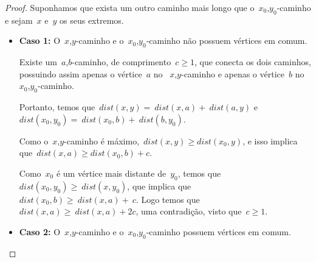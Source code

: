 \documentclass[a4paper,12pt]{article}
\begin{document}
	\begin{proof}
		Suponhamos que exista um outro caminho mais longo que 
		o~$x_0$,$y_0$-caminho e sejam~$x$ e~$y$ os seus extremos.

		\begin{itemize}
	        \item \textbf{Caso 1:} O~$x$,$y$-caminho e 
	        o~$x_0$,$y_0$-caminho não possuem vértices em comum.

	        Existe um~$a$,$b$-caminho, de 
	        comprimento~$c \ge 1$, que conecta os dois caminhos, 
	        possuindo assim apenas o vértice~$a$ 
	        no ~$x$,$y$-caminho e apenas o vértice~$b$ 
	        no~$x_0$,$y_0$-caminho.

	        \begin{center}  \end{center}


	        Portanto, temos 
	        que~$ dist(x,y) =~dist(x,a) +~dist(a,y)$ 
	        e~$ dist(x_0,y_0) =~dist(x_0,b) +~dist(b,y_0)$.

	        Como o~$x$,$y$-caminho é 
	        máximo,~$dist(x,y)\ge dist(x_0,y)$,
	        e isso implica que~$dist(x,a)\ge dist(x_0,b)+c$.

	        Como~$x_0$ é um vértice mais distante de~$y_0$, temos 
	        que~$dist(x_0,y_0)\ge~dist(x,y_0)$, que implica 
	        que~$dist(x_0,b)\ge~dist(x,a)+~c$.
	        Logo temos 
	        que~$dist(x,a)\ge~dist(x, a)+2c$,
	        uma contradição, visto que~$c\ge 1$.


			\bigskip
			\bigskip
			\bigskip


			\item \textbf{Caso 2:} O~$x$,$y$-caminho e 
			o~$x_0$,$y_0$-caminho possuem vértices em comum.


\end{itemize}
\end{proof}
\end{document}
